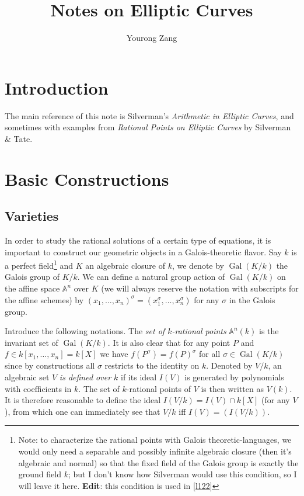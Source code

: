 \documentclass[12pt]{article}
\title{Notes on Elliptic Curves}
\author{Yourong Zang}
\theoremstyle{remark}
\newcommand{\s}[0]{\sigma}
\newcommand{\A}[0]{\mathbb{A}}
\newcommand{\Gal}[0]{\operatorname{Gal}}
\begin{document}
    \maketitle
    \tableofcontents
    \newpage
    \section{Introduction}\label{sec-intro}
        The main reference of this note is Silverman's \textit{Arithmetic in Elliptic Curves}, and sometimes with examples from \textit{Rational Points on Elliptic Curves} by Silverman \& Tate.

	\section{Basic Constructions}\label{sec-basic}
        \subsection{Varieties}\label{ssec-geometry-basic}
        In order to study the rational solutions of a certain type of equations, it is important to construct our geometric objects in a Galois-theoretic flavor. Say $k$ is a perfect field\footnote{Note: to characterize the rational points with Galois theoretic-languages, we would only need a separable and possibly infinite algebraic closure (then it's algebraic and normal) so that the fixed field of the Galois group is exactly the ground field $k$; but I don't know how Silverman would use this condition, so I will leave it here. \textbf{Edit}: this condition is used in \autoref{l122}} and $K$ an algebraic closure of $k$, we denote by $\Gal(K/k)$ the Galois group of $K/k$. We can define a natural group action of $\Gal(K/k)$ on the affine space $\A^n$ over $K$ (we will always reserve the notation with subscripts for the affine schemes) by $(x_1,\dots, x_n)^\s =(x_1^\s,\dots, x_n^\s)$ for any $\s$ in the Galois group.

        Introduce the following notations. The \textit{set of $k$-rational points} $\A^n(k)$ is the invariant set of $\Gal(K/k)$. It is also clear that for any point $P$ and $f\in k[x_1,\dots, x_n]=k[X]$ we have $f(P^\s)=f(P)^\s$ for all $\s\in\Gal(K/k)$ since by constructions all $\s$ restricts to the identity on $k$. Denoted by $V/k$, an algebraic set $V$ \textit{is defined over $k$} if its ideal $I(V)$ is generated by polynomials with coefficients in $k$. The set of $k$-rational points of $V$ is then written as $V(k)$. It is therefore reasonable to define the ideal $I(V/k)=I(V)\cap k[X]$ (for any $V$), from which one can immediately see that $V/k$ iff $I(V)=\left(I(V/k)\right)$.
\end{document}
